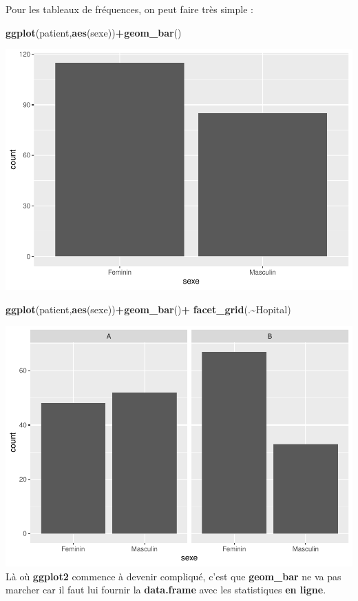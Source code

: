 \documentclass[
]{book}
\newenvironment{Shaded}{\begin{snugshade}}{\end{snugshade}}
\newcommand{\FunctionTok}[1]{\textcolor[rgb]{0.13,0.29,0.53}{\textbf{#1}}}
\newcommand{\NormalTok}[1]{#1}
\newcommand{\SpecialCharTok}[1]{\textcolor[rgb]{0.81,0.36,0.00}{\textbf{#1}}}
\begin{document}
Pour les tableaux de fréquences, on peut faire très simple :

\begin{Shaded}
\begin{Highlighting}[]
\FunctionTok{ggplot}\NormalTok{(patient,}\FunctionTok{aes}\NormalTok{(sexe))}\SpecialCharTok{+}\FunctionTok{geom\_bar}\NormalTok{()}
\end{Highlighting}
\end{Shaded}

\includegraphics{_main_files/figure-latex/ggplot17b-1.pdf}

\begin{Shaded}
\begin{Highlighting}[]
\FunctionTok{ggplot}\NormalTok{(patient,}\FunctionTok{aes}\NormalTok{(sexe))}\SpecialCharTok{+}\FunctionTok{geom\_bar}\NormalTok{()}\SpecialCharTok{+}
  \FunctionTok{facet\_grid}\NormalTok{(.}\SpecialCharTok{\textasciitilde{}}\NormalTok{Hopital)}
\end{Highlighting}
\end{Shaded}

\includegraphics{_main_files/figure-latex/ggplot18b-1.pdf}
Là où \textbf{ggplot2} commence à devenir compliqué, c'est que \textbf{geom\_bar} ne va pas
marcher car il faut lui fournir la \textbf{data.frame} avec les statistiques \textbf{en ligne}.
\end{document}
